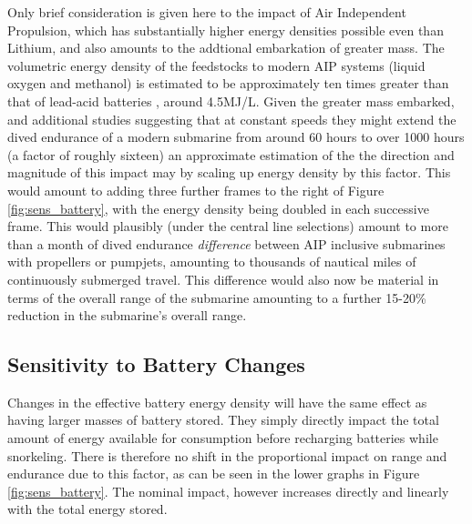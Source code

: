 \documentclass{article}\usepackage[]{graphicx}\usepackage[]{color}
\begin{document}
Only brief consideration is given here to the impact of Air Independent Propulsion, which has substantially higher energy densities possible even than Lithium, and also amounts to the addtional embarkation of greater mass. The volumetric energy density of the feedstocks to modern AIP systems (liquid oxygen and methanol) is estimated to be approximately ten times greater than that of lead-acid batteries \parencite{davies2016}, around 4.5MJ/L.  Given the greater mass embarked, and additional studies suggesting that at constant speeds they might extend the dived endurance of a modern submarine from around 60 hours to over 1000 hours (a factor of roughly sixteen) \parencite{buckingham2008submarine} an approximate estimation of the the direction and magnitude of this impact may by scaling up energy density by this factor.  This would amount to adding three further frames to the right of Figure \ref{fig:sens_battery}, with the energy density being doubled in each successive frame. This would plausibly (under the central line selections) amount to more than a month of dived endurance \textit{difference} between AIP inclusive submarines with propellers or pumpjets, amounting to thousands of nautical miles of continuously submerged travel.  This difference would also now be material in terms of the overall range of the submarine amounting to a further 15-20\% reduction in the submarine's overall range.


\subsection{Sensitivity to Battery Changes}

Changes in the effective battery energy density will have the same effect as having larger masses of battery stored.  They simply directly impact the total amount of energy available for consumption before recharging batteries while snorkeling. There is therefore no shift in the proportional impact on range and endurance due to this factor, as can be seen in the lower graphs in Figure \ref{fig:sens_battery}.  The nominal impact, however increases directly and linearly with the total energy stored.
\end{document}
